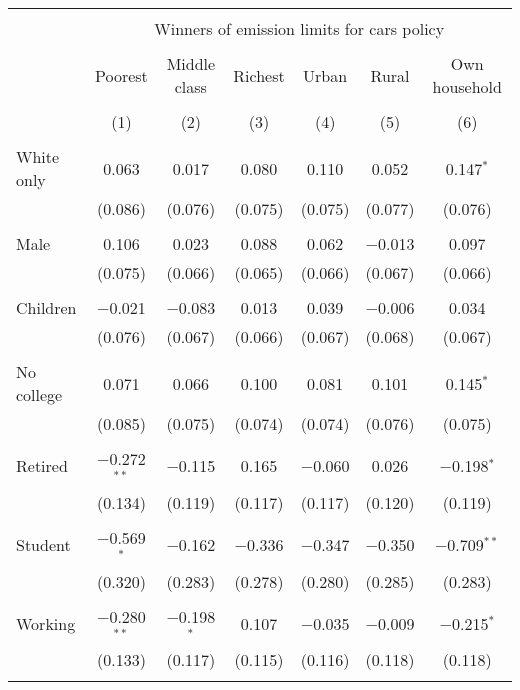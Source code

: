 
\begin{tabular}{@{\extracolsep{5pt}}lcccccc} 
\\[-1.8ex]\hline 
\hline \\[-1.8ex] 
 & \multicolumn{6}{c}{Winners of emission limits for cars policy} \\ 
\cline{2-7} 
\\[-1.8ex] & Poorest & Middle class & Richest & Urban & Rural & Own household \\ 
\\[-1.8ex] & (1) & (2) & (3) & (4) & (5) & (6)\\ 
\hline \\[-1.8ex] 
 White only & 0.063 & 0.017 & 0.080 & 0.110 & 0.052 & 0.147$^{*}$ \\ 
  & (0.086) & (0.076) & (0.075) & (0.075) & (0.077) & (0.076) \\ 
  & & & & & & \\ 
 Male & 0.106 & 0.023 & 0.088 & 0.062 & $-$0.013 & 0.097 \\ 
  & (0.075) & (0.066) & (0.065) & (0.066) & (0.067) & (0.066) \\ 
  & & & & & & \\ 
 Children & $-$0.021 & $-$0.083 & 0.013 & 0.039 & $-$0.006 & 0.034 \\ 
  & (0.076) & (0.067) & (0.066) & (0.067) & (0.068) & (0.067) \\ 
  & & & & & & \\ 
 No college & 0.071 & 0.066 & 0.100 & 0.081 & 0.101 & 0.145$^{*}$ \\ 
  & (0.085) & (0.075) & (0.074) & (0.074) & (0.076) & (0.075) \\ 
  & & & & & & \\ 
 Retired & $-$0.272$^{**}$ & $-$0.115 & 0.165 & $-$0.060 & 0.026 & $-$0.198$^{*}$ \\ 
  & (0.134) & (0.119) & (0.117) & (0.117) & (0.120) & (0.119) \\ 
  & & & & & & \\ 
 Student & $-$0.569$^{*}$ & $-$0.162 & $-$0.336 & $-$0.347 & $-$0.350 & $-$0.709$^{**}$ \\ 
  & (0.320) & (0.283) & (0.278) & (0.280) & (0.285) & (0.283) \\ 
  & & & & & & \\ 
 Working & $-$0.280$^{**}$ & $-$0.198$^{*}$ & 0.107 & $-$0.035 & $-$0.009 & $-$0.215$^{*}$ \\ 
  & (0.133) & (0.117) & (0.115) & (0.116) & (0.118) & (0.118) \\ 
  & & & & & & \\ 

\end{tabular}
